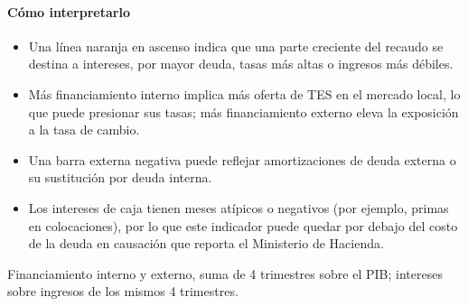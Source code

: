 \paragraph{Cómo interpretarlo}
\begin{itemize}
\item Una línea naranja en ascenso indica que una parte creciente del recaudo se destina a intereses, por mayor deuda, tasas más altas o ingresos más débiles.
\item Más financiamiento interno implica más oferta de TES en el mercado local, lo que puede presionar sus tasas; más financiamiento externo eleva la exposición a la tasa de cambio.
\item Una barra externa negativa puede reflejar amortizaciones de deuda externa o su sustitución por deuda interna.
\item Los intereses de caja tienen meses atípicos o negativos (por ejemplo, primas en colocaciones), por lo que este indicador puede quedar por debajo del costo de la deuda en causación que reporta el Ministerio de Hacienda.
\end{itemize}
\begin{formulas}[Fórmulas]
\end{formulas}
\begin{metodo}[Metodología]
Financiamiento interno y externo, suma de 4 trimestres sobre el PIB; intereses sobre ingresos de los mismos 4 trimestres.
\par{}
\end{metodo}

